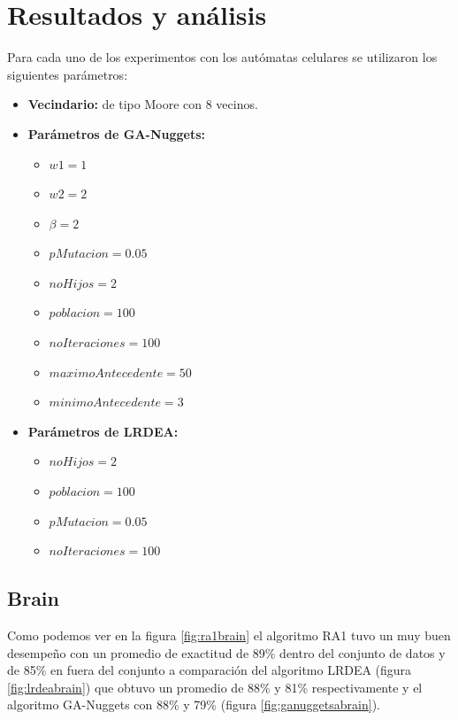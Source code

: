 \chapter{Resultados y análisis}

Para cada uno de los experimentos con los autómatas celulares se utilizaron los siguientes parámetros:

\begin{itemize}
	\item \textbf{Vecindario:} de tipo Moore con 8 vecinos.
	\item \textbf{Parámetros de GA-Nuggets:}
	\begin{itemize}
		\item $w1=1$ 
		\item $w2=2$ 
		\item $\beta=2$ 
		\item $pMutacion=0.05$
		\item $noHijos=2$ 
		\item $poblacion=100$ 
		\item $noIteraciones=100$
		\item $maximoAntecedente=50$
		\item $minimoAntecedente=3$
	\end{itemize}
	\item \textbf{Parámetros de LRDEA:}
	\begin{itemize}
		\item $noHijos=2$
		\item $poblacion=100$
		\item $pMutacion=0.05$
		\item $noIteraciones=100$
	\end{itemize}
\end{itemize}

\section{Brain}

Como podemos ver en la figura \ref{fig:ra1brain} el algoritmo RA1 tuvo un muy buen desempeño con un promedio de exactitud de 89\% dentro del conjunto de datos y de 85\% en fuera del conjunto  a comparación del algoritmo LRDEA (figura \ref{fig:lrdeabrain}) que obtuvo un promedio de 88\% y 81\% respectivamente y el algoritmo GA-Nuggets con 88\% y 79\% (figura \ref{fig:ganuggetsabrain}).

